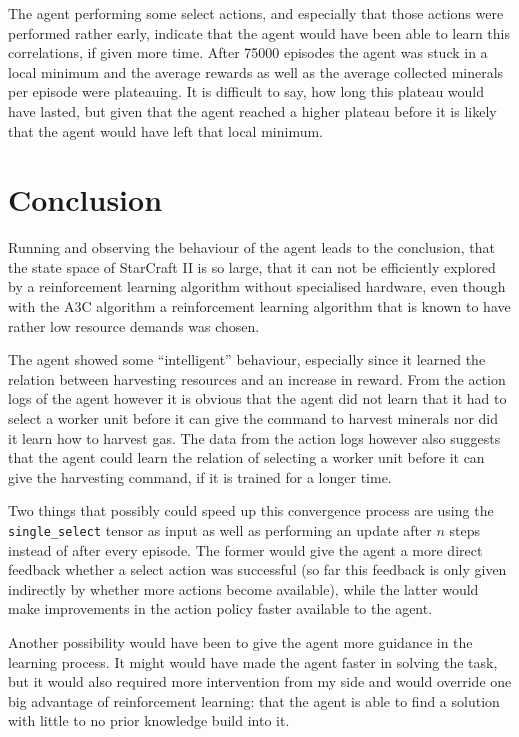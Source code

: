 \documentclass{article}
\begin{document}
The agent performing some select actions, and especially that those actions 
were performed rather early, indicate that the agent would have been able to 
learn this correlations, if given more time. After 75000 episodes the agent was 
stuck in a local minimum and the average rewards as well as the average 
collected minerals per episode were plateauing. It is difficult to say, how 
long this plateau would have lasted, but given that the agent reached a higher 
plateau before it is likely that the agent would have left that local minimum.

\section{Conclusion}
Running and observing the behaviour of the agent leads to the conclusion, that 
the state space of StarCraft II is so large, that it can not be efficiently 
explored by a reinforcement learning algorithm without specialised hardware, 
even though with the A3C algorithm a reinforcement learning algorithm that is 
known to have rather low resource demands was chosen.

The agent showed some ``intelligent'' behaviour, especially since it learned 
the relation between harvesting resources and an increase in reward. From the 
action logs of the agent however it is obvious that the agent did not learn 
that it had to select a worker unit before it can give the command to harvest 
minerals nor did it learn how to harvest gas. The data from the action logs 
however also suggests that the agent could learn the relation of selecting a 
worker unit before it can give the harvesting command, if it is trained for a 
longer time.

Two things that possibly could speed up this convergence process are using the 
\texttt{single\_select} tensor as input as well as performing an update after 
$n$ steps instead of after every episode. The former would give the agent a 
more direct feedback whether a select action was successful (so far this 
feedback is only given indirectly by whether more actions become available), 
while the latter would make improvements in the action policy faster available 
to the agent.

Another possibility would have been to give the agent more guidance in the 
learning process. It might would have made the agent faster in solving the 
task, but it would also required more intervention from my side and would 
override one big advantage of reinforcement learning: that the agent is able to 
find a solution with little to no prior knowledge build into it.
\end{document}
